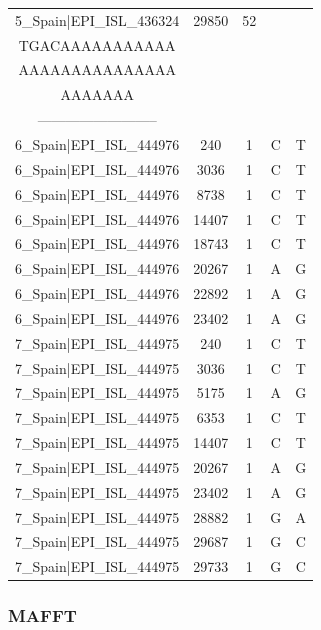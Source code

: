 \documentclass[a4paper,10pt]{article}
\begin{document}
\begin{longtable}{@{}ccccc@{}}
5\_Spain|EPI\_ISL\_436324 & 29850 & 52 & \begin{tabular}[c]{@{}c@{}}AGCTTCTTAGGAGAA\\ TGACAAAAAAAAAAA\\ AAAAAAAAAAAAAAA\\ AAAAAAA\end{tabular} & \begin{tabular}[c]{@{}c@{}}--------------------------\\ --------------------------\end{tabular} \\* \midrule
6\_Spain|EPI\_ISL\_444976 & 240 & 1 & C & T \\* \midrule
6\_Spain|EPI\_ISL\_444976 & 3036 & 1 & C & T \\* \midrule
6\_Spain|EPI\_ISL\_444976 & 8738 & 1 & C & T \\* \midrule
6\_Spain|EPI\_ISL\_444976 & 14407 & 1 & C & T \\* \midrule
6\_Spain|EPI\_ISL\_444976 & 18743 & 1 & C & T \\* \midrule
6\_Spain|EPI\_ISL\_444976 & 20267 & 1 & A & G \\* \midrule
6\_Spain|EPI\_ISL\_444976 & 22892 & 1 & A & G \\* \midrule
6\_Spain|EPI\_ISL\_444976 & 23402 & 1 & A & G \\* \midrule
7\_Spain|EPI\_ISL\_444975 & 240 & 1 & C & T \\* \midrule
7\_Spain|EPI\_ISL\_444975 & 3036 & 1 & C & T \\* \midrule
7\_Spain|EPI\_ISL\_444975 & 5175 & 1 & A & G \\* \midrule
7\_Spain|EPI\_ISL\_444975 & 6353 & 1 & C & T \\* \midrule
7\_Spain|EPI\_ISL\_444975 & 14407 & 1 & C & T \\* \midrule
7\_Spain|EPI\_ISL\_444975 & 20267 & 1 & A & G \\* \midrule
7\_Spain|EPI\_ISL\_444975 & 23402 & 1 & A & G \\* \midrule
7\_Spain|EPI\_ISL\_444975 & 28882 & 1 & G & A \\* \midrule
7\_Spain|EPI\_ISL\_444975 & 29687 & 1 & G & C \\* \midrule
7\_Spain|EPI\_ISL\_444975 & 29733 & 1 & G & C \\* \bottomrule
\end{longtable}

\newpage
\subsubsection{MAFFT}
\end{document}
